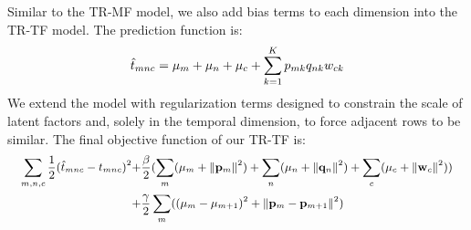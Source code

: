 %
Similar to the TR-MF model, we also add bias terms to each dimension into the TR-TF model. The prediction function is:
\begin{equation*}
\small
\hat{t}_{mnc}=\mu_m+\mu_n+\mu_c+\sum\limits_{k=1}^{K}{p_{mk} q_{nk} w_{ck}}
\end{equation*}
%
We extend the model with regularization terms designed to constrain the scale of latent factors
and, solely in the temporal dimension, to force adjacent rows to be similar.
The final objective function of our TR-TF is:\\
\begin{equation*}
\small
\begin{aligned}
\sum\limits_{m, n, c} \frac{1}{2}(\hat{t}_{mnc}- t_{mnc})^2
+ &\frac{\beta}{2}(\sum_m(\mu_m + \|\mathbf{p}_m\|^2) + \sum_n(\mu_n + \|\mathbf{q}_n\|^2) + \sum_c(\mu_c + \|\mathbf{w}_c\|^2))\\
+ &\frac{\gamma}{2}\sum_m((\mu_m-\mu_{m+1})^2 + \|\mathbf{p}_m-\mathbf{p}_{m+1}\|^2)\\
\end{aligned}
\end{equation*}

